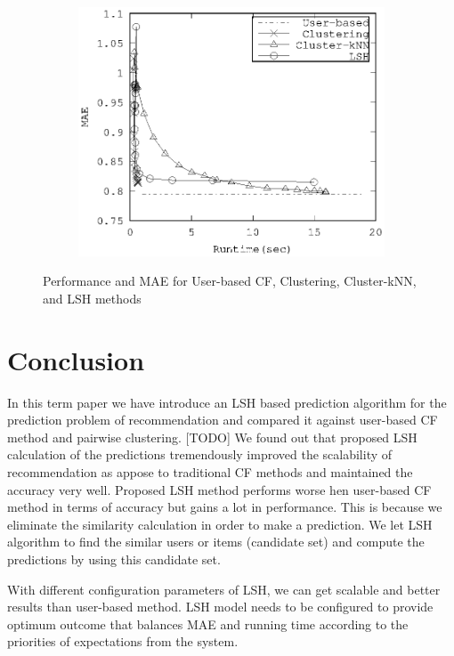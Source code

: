 \documentclass[conference]{IEEEtran}
\begin{document}
\begin{figure}
        \centering
        \begin{subfigure}[b]{0.45\textwidth}
                \includegraphics[width=\textwidth]{charts/performance-all.eps}
        \end{subfigure}
        \caption{Performance and MAE for User-based CF, Clustering, Cluster-kNN, and LSH methods}
        \label{fig:performance-all}
\end{figure}


\section{Conclusion}
\label{sec:conclusion}

In this term paper we have introduce an LSH based prediction algorithm for 
the prediction problem of recommendation and compared it against user-based CF
method and pairwise clustering.
 [TODO]
We found out that proposed LSH calculation of the predictions tremendously 
improved the scalability of recommendation as appose to traditional CF methods 
and maintained the accuracy very well. Proposed LSH method performs 
worse hen user-based CF method in terms of accuracy but gains a lot in performance.
This is because we eliminate the similarity calculation in order to make a prediction. 
We let LSH algorithm to find the similar users or items (candidate set) and compute 
the predictions by using this candidate set.

With different configuration parameters of LSH, we can get scalable and 
better results than user-based method. LSH model needs to be
configured to provide optimum outcome that balances MAE  and running time
according to the priorities of expectations from the system.
\end{document}
